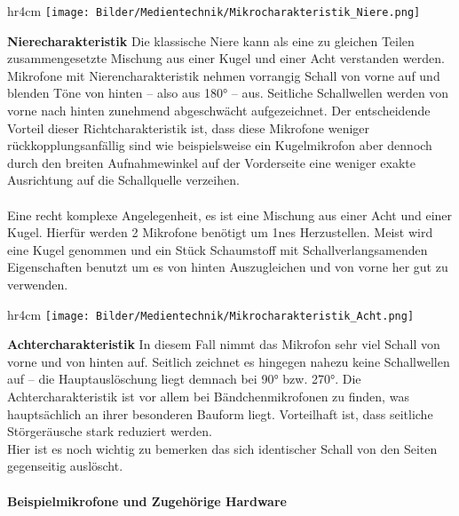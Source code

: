 \begin{wrapfigure}{hr}{4cm}\vspace{-1cm}
\texttt{[image: Bilder/Medientechnik/Mikrocharakteristik\_Niere.png]}
\end{wrapfigure}
 \textbf{Nierecharakteristik} Die klassische Niere kann als eine zu gleichen Teilen zusammengesetzte Mischung aus einer Kugel und einer Acht verstanden werden. Mikrofone mit Nierencharakteristik nehmen vorrangig Schall von vorne auf und blenden Töne von hinten – also aus 180° – aus. Seitliche Schallwellen werden von vorne nach hinten zunehmend abgeschwächt aufgezeichnet. Der entscheidende Vorteil dieser Richtcharakteristik ist, dass diese Mikrofone weniger rückkopplungsanfällig sind wie beispielsweise ein Kugelmikrofon aber dennoch durch den breiten Aufnahmewinkel auf der Vorderseite eine weniger exakte Ausrichtung auf die Schallquelle verzeihen.\\~\\Eine recht komplexe Angelegenheit, es ist eine Mischung aus einer Acht und einer Kugel. Hierfür werden 2 Mikrofone benötigt um 1nes Herzustellen.
Meist wird eine Kugel genommen und ein Stück Schaumstoff mit Schallverlangsamenden Eigenschaften benutzt um es von hinten Auszugleichen und von vorne her gut zu verwenden.\\

 \begin{wrapfigure}{hr}{4cm}\vspace{-1cm}
\texttt{[image: Bilder/Medientechnik/Mikrocharakteristik\_Acht.png]}
\end{wrapfigure}
 \textbf{Achtercharakteristik} In diesem Fall nimmt das Mikrofon sehr viel Schall von vorne und von hinten auf. Seitlich zeichnet es hingegen nahezu keine Schallwellen auf – die Hauptauslöschung liegt demnach bei 90° bzw. 270°. Die Achtercharakteristik ist vor allem bei Bändchenmikrofonen zu finden, was hauptsächlich an ihrer besonderen Bauform liegt. Vorteilhaft ist, dass seitliche Störgeräusche stark reduziert werden.\\ Hier ist es noch wichtig zu bemerken das sich identischer Schall von den Seiten gegenseitig auslöscht.

 \paragraph{Beispielmikrofone und Zugehörige Hardware}~\\


